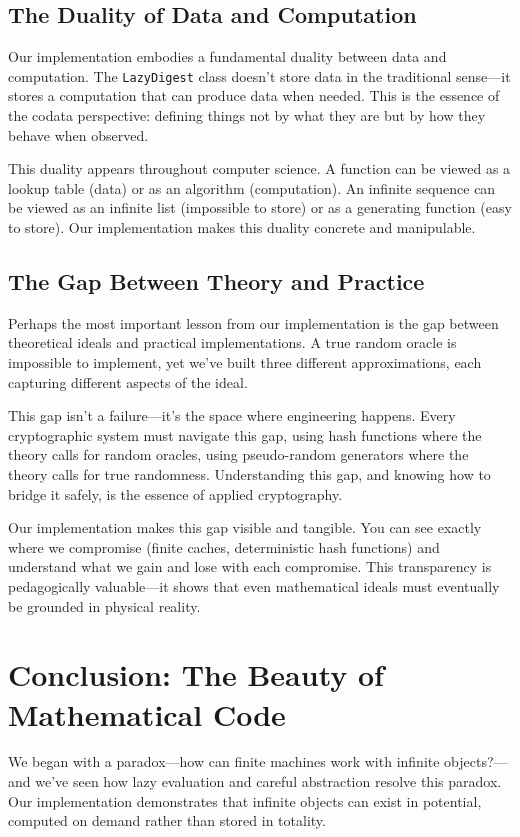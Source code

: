 \documentclass[11pt]{article}
\begin{document}
\subsection{The Duality of Data and Computation}

Our implementation embodies a fundamental duality between data and computation. The \texttt{LazyDigest} class doesn't store data in the traditional sense---it stores a computation that can produce data when needed. This is the essence of the codata perspective: defining things not by what they are but by how they behave when observed.

This duality appears throughout computer science. A function can be viewed as a lookup table (data) or as an algorithm (computation). An infinite sequence can be viewed as an infinite list (impossible to store) or as a generating function (easy to store). Our implementation makes this duality concrete and manipulable.

\subsection{The Gap Between Theory and Practice}

Perhaps the most important lesson from our implementation is the gap between theoretical ideals and practical implementations. A true random oracle is impossible to implement, yet we've built three different approximations, each capturing different aspects of the ideal.

This gap isn't a failure---it's the space where engineering happens. Every cryptographic system must navigate this gap, using hash functions where the theory calls for random oracles, using pseudo-random generators where the theory calls for true randomness. Understanding this gap, and knowing how to bridge it safely, is the essence of applied cryptography.

Our implementation makes this gap visible and tangible. You can see exactly where we compromise (finite caches, deterministic hash functions) and understand what we gain and lose with each compromise. This transparency is pedagogically valuable---it shows that even mathematical ideals must eventually be grounded in physical reality.

\section{Conclusion: The Beauty of Mathematical Code}

We began with a paradox---how can finite machines work with infinite objects?---and we've seen how lazy evaluation and careful abstraction resolve this paradox. Our implementation demonstrates that infinite objects can exist in potential, computed on demand rather than stored in totality.
\end{document}
